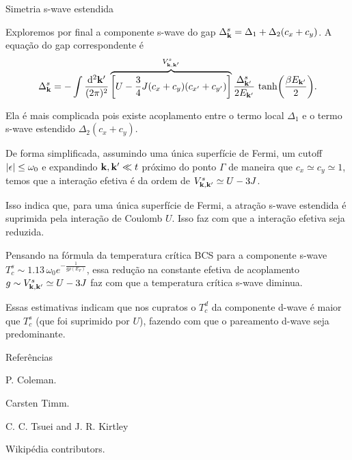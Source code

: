 \documentclass[8pt,aspectratio=169,xcolor={table,dvipsnames,usenames}]{beamer}
\begin{document}

\begin{frame}{Simetria s-wave estendida}

Exploremos por final a componente s-wave do gap $\Delta_{\vb{k}}^s = \Delta_1 + \Delta_2 (c_x + c_y)$. A equação do gap correspondente é
$$
\Delta_{\vb{k}}^s = - \int \frac{\dd[2]{\vb{k}'}}{(2\pi)^2}
\overbrace{\qty[U - \frac{3}{4} J (c_x + c_y)(c_{x'}+ c_{y'})]}^{V_{\vb{k},\vb{k}'}^s}
\frac{\Delta_{\vb{k}'}^s}{2 E_{\vb{k}'}} \, \tanh(\frac{\beta E_{\vb{k}'}}{2}).
$$

Ela é mais complicada pois existe acoplamento entre o termo local $\Delta_1$ e o termo s-wave estendido $\Delta_2 (c_x + c_y)$.

\n

De forma simplificada, assumindo uma única superfície de Fermi, um cutoff $\abs{\epsilon} \leq \omega_0$ e expandindo $\vb{k}, \vb{k}' \ll t$ próximo do ponto $\Gamma$ de maneira que $c_x \simeq c_y \simeq 1$, temos que a interação efetiva é da ordem de $V_{\vb{k},\vb{k}'}^s \simeq U - 3J$.
\n

Isso indica que, para uma única superfície de Fermi, a atração s-wave estendida é suprimida pela interação de Coulomb $U$. Isso faz com que a interação efetiva seja reduzida.

\n

Pensando na fórmula da temperatura crítica BCS para a componente s-wave $T_c^s \sim 1.13 \, \omega_0 e^{-\frac{1}{g \rho(E_F)}}$, essa redução na constante efetiva de acoplamento $g \sim V_{\vb{k},\vb{k}'}^s \simeq U-3J$ faz com que a temperatura crítica s-wave diminua.

\n

Essas estimativas indicam que nos cupratos o $T_c^d$ da componente d-wave é maior que $T_c^s$ (que foi suprimido por $U$), fazendo com que o pareamento d-wave seja predominante.

\end{frame}


\begin{frame}{Referências}

\footnotesize

\begin{thebibliography}{10}
\alert{P. Coleman.}

\alert{Carsten Timm.}

\alert{C. C. Tsuei and J. R. Kirtley}

\alert{Wikipédia contributors.}

\end{thebibliography}


\end{frame}
\end{document}
